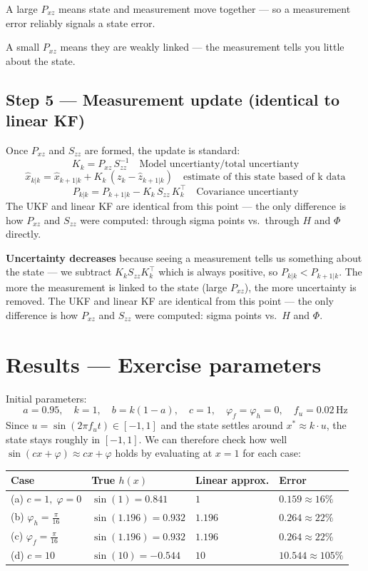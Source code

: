 \documentclass[12pt, a4paper]{article}
\begin{document}
A large $P_{xz}$ means state and measurement move together ---
so a measurement error reliably signals a state error.

A small $P_{xz}$ means they are weakly linked --- the measurement tells you little about the state.

\subsection*{Step 5 --- Measurement update (identical to linear KF)}

Once $P_{xz}$ and $S_{zz}$ are formed, the update is standard:
\[
  K_k = P_{xz}\,S_{zz}^{-1} \quad \text{Model uncertianty/total uncertianty}
\]
\[
  \hat{x}_{k|k} = \hat{x}_{k+1|k} + K_k\,(z_k - \hat{z}_{k+1|k}) \quad \text{estimate of this state based of k data}
\]
\[
  P_{k|k} = P_{k+1|k} - K_k\,S_{zz}\,K_k^\top \quad \text{Covariance uncertianty}
\]
The UKF and linear KF are identical from this point --- the only
difference is how $P_{xz}$ and $S_{zz}$ were computed: through sigma
points vs.\ through $H$ and $\Phi$ directly.
\begin{notebox}
  \textbf{Uncertainty decreases} because seeing a measurement tells us
something about the state --- we subtract $K_k S_{zz} K_k^\top$ which
is always positive, so $P_{k|k} < P_{k+1|k}$. The more the measurement
is linked to the state (large $P_{xz}$), the more uncertainty is removed.
The UKF and linear KF are identical from this point --- the only difference
is how $P_{xz}$ and $S_{zz}$ were computed: sigma points vs.\ $H$ and $\Phi$.
\end{notebox}

\clearpage
\section*{Results --- Exercise parameters}
Initial parameters:
\[
  a = 0.95, \quad k = 1, \quad b = k(1-a), \quad c = 1, \quad
  \varphi_f = \varphi_h = 0, \quad f_u = 0.02\,\text{Hz}
\]
Since $u = \sin(2\pi f_u t) \in [-1,1]$ and the state settles around
$x^* \approx k \cdot u$, the state stays roughly in $[-1, 1]$.
We can therefore check how well $\sin(cx + \varphi) \approx cx + \varphi$ holds
by evaluating at $x = 1$ for each case:

\begin{center}
\renewcommand{\arraystretch}{1.5}
\begin{tabular}{p{2.5cm} p{3.5cm} p{3.5cm} p{3.5cm}}
  \toprule
  \textbf{Case} & \textbf{True $h(x)$} & \textbf{Linear approx.} & \textbf{Error} \\
  \midrule
  (a) $c=1,\;\varphi=0$
    & $\sin(1) = 0.841$
    & $1$
    & $0.159 \approx 16\%$ \\
  (b) $\varphi_h = \frac{\pi}{16}$
    & $\sin(1.196) = 0.932$
    & $1.196$
    & $0.264 \approx 22\%$ \\
  (c) $\varphi_f = \frac{\pi}{16}$
    & $\sin(1.196) = 0.932$
    & $1.196$
    & $0.264 \approx 22\%$ \\
  (d) $c = 10$
    & $\sin(10) = -0.544$
    & $10$
    & $10.544 \approx 105\%$ \\
  \bottomrule
\end{tabular}
\end{center}
\end{document}
